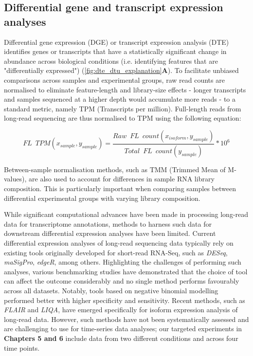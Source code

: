 \subsection{Differential gene and transcript expression analyses}
Differential gene expression (DGE) or transcript expression analysis (DTE) identifies genes or transcripts that have a statistically significant change in abundance across biological conditions (i.e. identifying features that are "differentially expressed") (\cref{fig:dte_dtu_explanation}\textbf{A}). To facilitate unbiased comparisons across samples and experimental groups, raw read counts are normalised to eliminate feature-length and library-size effects - longer transcripts and samples sequenced at a higher depth would accumulate more reads - to a standard metric, namely TPM (Transcripts per million). Full-length reads from long-read sequencing are thus normalised to TPM using the following equation: 

\begin{myequation}[!h]
	\begin{equation}
		FL\;\:TPM (x_{sample},y_{sample})=\frac{Raw\;\:FL\;\:count (x_{isoform},y_{sample})}{Total\;\:FL\;\:count (y_{sample})} *10^6
	\end{equation}
\end{myequation}

Between-sample normalisation methods, such as TMM\cite{Robinson2010} (Trimmed Mean of M-values), are also used to account for differences in sample RNA library composition. This is particularly important when comparing samples between differential experimental groups with varying library composition. 

While significant computational advances have been made in processing long-read data for transcriptome annotations, methods to harness such data for downstream differential expression analyses have been limited. Current differential expression analyses of long-read sequencing data typically rely on existing tools originally developed for short-read RNA-Seq\cite{Amarasinghe2020}, such as \textit{DESeq}, \textit{maSigPro}, \textit{edgeR}, among others. Highlighting the challenges of performing such analyses, various benchmarking studies have demonstrated that the choice of tool can affect the outcome considerably and no single method performs favourably across all datasets. Notably, tools based on negative binomial modelling performed better with higher specificity and sensitivity\cite{Rapaport2013}. Recent methods, such as \textit{FLAIR} and \textit{LIQA}\cite{Hu2021}, have emerged specifically for isoform expression analysis of long-read data. However, such methods have not been systematically assessed and are challenging to use for time-series data analyses; our targeted experiments in \textbf{Chapters 5 and 6} include data from two different conditions and across four time points. 

